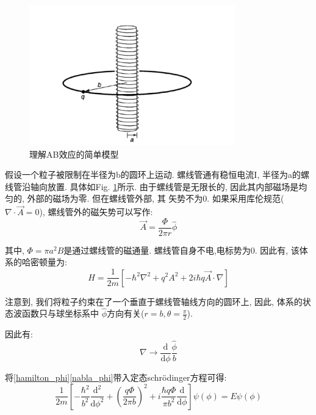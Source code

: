 \documentclass[a4paper, 11pt]{article}
\begin{document}
\begin{spacing}{1.2}
        \begin{figure}[H]
          \centering\includegraphics[width=3.5in]{image/ABeffect_1}
          \caption{理解AB效应的简单模型}\label{AB_effect_1} 
        \end{figure}
        
        假设一个粒子被限制在半径为b的圆环上运动. 螺线管通有稳恒电流I, 半径为a的螺线管沿轴向放置. 具体如Fig.%
        \ref{AB_effect_1}所示. 由于螺线管是无限长的, 因此其内部磁场是均匀的, 外部的磁场为零. 但在螺线管外部, 其
        矢势不为0. 如果采用库伦规范($\nabla\cdot\vec{A} = 0$), 螺线管外的磁矢势可以写作: 
        \begin{equation}
          \vec{A} = \frac{\Phi}{2\pi{}r}\hat{\phi}
        \end{equation}
        
        其中, $\Phi = \pi{}a^2B$是通过螺线管的磁通量. 螺线管自身不电,电标势为0. 因此有, 该体系的哈密顿量为:
        \begin{equation}  
          \label{hamilton_phi}
          H = \dfrac{1}{2m}\left[-\hbar^2\nabla^2+q^2A^2+2i\hbar{}q\vec{A}\cdot\nabla\right]
        \end{equation}

        注意到, 我们将粒子约束在了一个垂直于螺线管轴线方向的圆环上, 因此, 体系的状态波函数只与球坐标系中
        $\hat\phi$方向有关($r = b, \theta = \frac{\pi}{2}$). 

        因此有:
        \begin{equation}
          \label{nabla_phi}
          \nabla \to \dfrac{\mathrm{d}}{\mathrm{d}\phi}\dfrac{\hat\phi}{b}
        \end{equation}

        将\eqref{hamilton_phi}\eqref{nabla_phi}带入定态schr\"odinger方程可得:  
        \begin{equation}
          \dfrac{1}{2m}\left[-\dfrac{\hbar^2}{b^2}\dfrac{\mathrm{d}^2}{\mathrm{d}\phi^2}%
           + \left(\dfrac{q\Phi}{2\pi{}b}\right)^2+i\dfrac{\hbar{}q\Phi}{\pi{}b^2}%
          \dfrac{\mathrm{d}}{\mathrm{d}\phi}\right]\psi(\phi) = E\psi(\phi)
        \end{equation}
        

\end{spacing}
\end{document}
